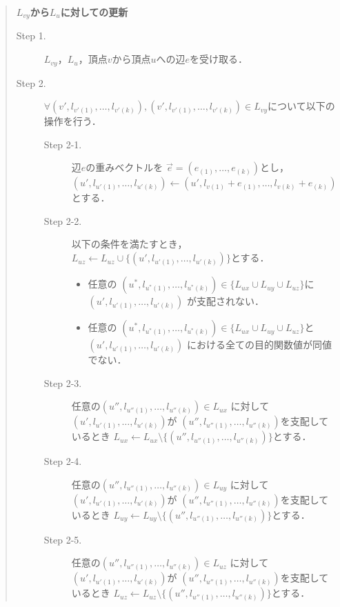 \documentclass[12pt]{optlab-bachelor}
\begin{document}
\begin{quote}
  \textbf{$L_{vy}$から$L_u$に対しての更新}
  \begin{description}
    \item[Step 1.] $L_{vy}$，$L_u$，頂点$v$から頂点$u$への辺$e$を受け取る．
    \item[Step 2.] $\forall (v',l_{v'(1)},\ldots,l_{v'(k)}),
    (v',l_{v'(1)},\ldots,l_{v'(k)}) \in L_{vy}$について以下の操作を行う．
    \begin{description}
      \item[Step 2-1.] 辺$e$の重みベクトルを
      $\vec{e} = (e_{(1)},\ldots,e_{(k)})$とし，
      $(u',l_{u'(1)},\ldots,l_{u'(k)}) \leftarrow
      (u',l_{v(1)}+e_{(1)},\ldots,l_{v(k)}+e_{(k)})$とする．
      \item[Step 2-2.] 以下の条件を満たすとき，
      $L_{uz} \leftarrow L_{uz} \cup \{(u',l_{u'(1)},\ldots,l_{u'(k)})\}$とする．
      \begin{itemize}
        \item 任意の $(u^*,l_{u^*(1)},\ldots,l_{u^*(k)})\in \{L_{ux} \cup L_{uy} \cup L_{uz}\}$に
        $(u',l_{u'(1)},\ldots,l_{u'(k)})$ が支配されない．
        \item 任意の $(u^*,l_{u^*(1)},\ldots,l_{u^*(k)}) \in \{L_{ux} \cup L_{uy} \cup L_{uz}\}$と
        $(u',l_{u'(1)},\ldots,l_{u'(k)})$ における全ての目的関数値が同値でない．
      \end{itemize}
      \item[Step 2-3.] 任意の$(u'',l_{u''(1)},\ldots,l_{u''(k)})\in L_{ux}$
      に対して$(u',l_{u'(1)},\ldots,l_{u'(k)})$が
      $(u'',l_{u''(1)},\ldots,l_{u''(k)})$を支配しているとき
      $L_{ux} \leftarrow L_{ux} \setminus \{(u'',l_{u''(1)},\ldots,l_{u''(k)})\}$とする．
      \item[Step 2-4.] 任意の$(u'',l_{u''(1)},\ldots,l_{u''(k)})\in L_{uy}$
      に対して$(u',l_{u'(1)},\ldots,l_{u'(k)})$が
      $(u'',l_{u''(1)},\ldots,l_{u''(k)})$を支配しているとき
      $L_{uy} \leftarrow L_{uy} \setminus \{(u'',l_{u''(1)},\ldots,l_{u''(k)})\}$とする．
      \item[Step 2-5.] 任意の$(u'',l_{u''(1)},\ldots,l_{u''(k)})\in L_{uz}$
      に対して$(u',l_{u'(1)},\ldots,l_{u'(k)})$が
      $(u'',l_{u''(1)},\ldots,l_{u''(k)})$を支配しているとき
      $L_{uz} \leftarrow L_{uz} \setminus \{(u'',l_{u''(1)},\ldots,l_{u''(k)})\}$とする．
    \end{description}
  \end{description}
\end{quote}
\end{document}
